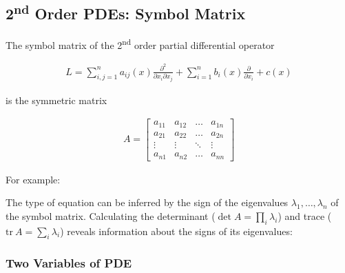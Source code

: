 \subsection{2\textsuperscript{nd} Order PDEs: Symbol Matrix}

The symbol matrix of the 2\textsuperscript{nd} order partial differential operator

\begin{align*}
    L=\sum_{i,j=1}^{n}a_{ij}(x)\frac{\partial^2}{\partial x_i \partial x_j}+\sum_{i=1}^n b_i(x)\frac{\partial}{\partial x_i}+c(x)
\end{align*}

is the symmetric matrix

\begin{align*}
    A=
    \begin{bmatrix}
        a_{11} & a_{12} & \ldots & a_{1n} \\
        a_{21} & a_{22} & \ldots & a_{2n} \\
        \vdots & \vdots & \ddots & \vdots \\
        a_{n1} & a_{n2} & \ldots & a_{nn}
    \end{bmatrix}
\end{align*}

For example:

\begin{center}
\end{center}

The type of equation can be inferred by the sign of the eigenvalues $\lambda_1,\ldots,\lambda_n$ of the symbol matrix.
Calculating the determinant ($\det A=\prod_i \lambda_i$) and trace ($\mathrm{tr}\ A=\sum_i \lambda_i$)
reveals information about the signs of its eigenvalues:

\subsubsection{Two Variables of PDE}

